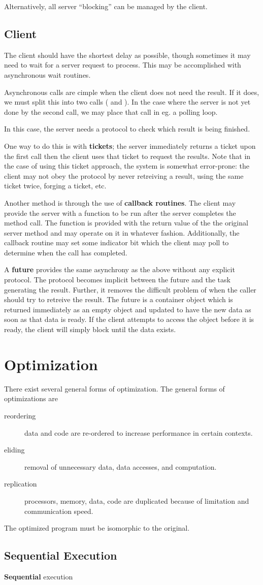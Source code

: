 \documentclass[12pt]{article}
\begin{document}
Alternatively, all server ``blocking'' can be managed by the client.

\subsection{Client}
The client should have the shortest delay as possible, though sometimes it may need to wait for a server request to process. This may be accomplished with asynchronous wait routines.

Asynchronous calls are cimple when the client does not need the result. If it does, we must split this into two calls ( and ). In the case where the server is not yet done by the second call, we may place that call in eg. a polling loop.

In this case, the server needs a protocol to check which result is being finished.

One way to do this is with {\bf tickets}; the server immediately returns a ticket upon the first call then the client uses that ticket to request the results. Note that in the case of using this ticket approach, the system is somewhat error-prone: the client may not obey the protocol by never retreiving a result, using the same ticket twice, forging a ticket, etc.

Another method is through the use of {\bf callback routines}. The client may provide the server with a function to be run after the server completes the method call. The function is provided with the return value of the the original server method and may operate on it in whatever fashion. Additionally, the callback routine may set some indicator bit which the client may poll to determine when the call has completed.

A {\bf future} provides the same asynchrony as the above without any explicit protocol. The protocol becomes implicit between the future and the task generating the result. Further, it removes the difficult problem of when the caller should try to retreive the result. The future is a container object which is returned immediately as an empty object and updated to have the new data as soon as that data is ready. If the client attempts to access the object before it is ready, the client will simply block until the data exists.

\section{Optimization}
There exist several general forms of optimization. The general forms of optimizations are
\begin{description}
\item[reordering] data and code are re-ordered to increase performance in certain contexts.
\item[eliding] removal of unnecessary data, data accesses, and computation.
\item[replication] processors, memory, data, code are duplicated because of limitation and communication speed.
\end{description}

The optimized program must be isomorphic to the original.

\subsection{Sequential Execution}
{\bf Sequential} execution
\end{document}
